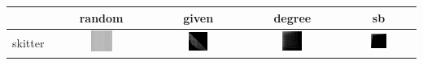 \documentclass{article}
\begin{document}
\begin{table}[h]
\begin{tabular}{l | c c c c}
\hline
 & random & given & degree & sb \\
\hline
skitter
&
    \includegraphics[width=0.23\textwidth]{../img/skitter/adjacency-matrix-random-ordering.png}
& 
    \includegraphics[width=0.23\textwidth]{../img/skitter/adjacency-matrix-given-ordering.png}
& 
    \includegraphics[width=0.23\textwidth]{../img/skitter/adjacency-matrix-degree-ordering.png}
& 
    \includegraphics[width=0.23\textwidth]{../img/skitter/adjacency-matrix-slashburn-ordering.png} \\


\end{tabular}
\end{table}
\end{document}
